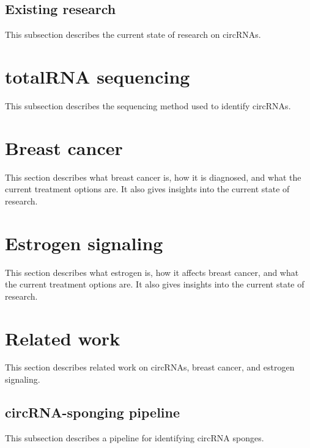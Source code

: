 \subsection{Existing research}
This subsection describes the current state of research on circRNAs.

\section{totalRNA sequencing}
This subsection describes the sequencing method used to identify circRNAs.

\lipsum[2]

\section{Breast cancer}
This section describes what breast cancer is, how it is diagnosed, and what the current treatment options are.
It also gives insights into the current state of research.

\lipsum[3]

\section{Estrogen signaling}
This section describes what estrogen is, how it affects breast cancer, and what the current treatment options are.
It also gives insights into the current state of research.

\lipsum[4]

\section{Related work}
This section describes related work on circRNAs, breast cancer, and estrogen signaling.

\subsection{circRNA-sponging pipeline}
This subsection describes a pipeline for identifying circRNA sponges.